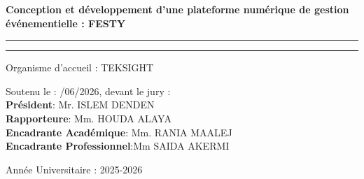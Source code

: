 \begin{titlepage}
    \vspace{0.45\baselineskip} %

    {\Large \textbf{Conception et développement d’une plateforme numérique de gestion événementielle : FESTY}}

    \textcolor{customblue}{\rule{\textwidth}{0.4pt}}\vspace*{-\baselineskip}\vspace{3.6pt} %
    \textcolor{customblue}{\rule{\textwidth}{1.6pt}} %

    \vspace{0.45\baselineskip} %
    
    
    {\large Organisme d’accueil : TEKSIGHT}
    
    
     \begin{flushleft}
        { \normalsize {Soutenu le} : /06/2026, devant le jury : }\\
        {\normalsize \textbf{Président}: Mr. ISLEM DENDEN}\\ 
        {\normalsize \textbf{Rapporteure}: Mm. HOUDA ALAYA}\\
        {\normalsize \textbf{Encadrante Académique}: Mm. RANIA MAALEJ}\\
          {\normalsize \textbf{Encadrante Professionnel}:Mm SAIDA AKERMI }
    \end{flushleft}

    
    \vspace{0.25cm}
    
    \fbox{
    \begin{minipage}{150pt}
        \centering
        \vspace{8pt} %
        {\large GLSI - 322603999}
        \vspace{8pt} %
    \end{minipage}
    }

    
    \vspace{0.2cm}
    
    {\large Année Universitaire : 2025-2026}
    
\end{titlepage}
